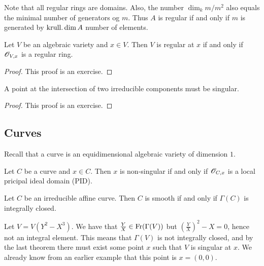 Note that all regular rings are domains.  Also, the number $\dim_k m/m^2$ also equals the minimal number of generators og $m$. Thus $A$ is regular if and only if $m$ is generated by $\operatorname{krull.dim} A$ number of elements. 

\begin{proposition}
Let $V$ be an algebraic variety and $x\in V$. Then $V$ is regular at $x$ if and only if $\mathscr{O}_{V,x}$ is a regular ring.
\end{proposition}
\begin{proof}
This proof is an exercise.
\end{proof}

\begin{proposition}
A point at the intersection of two irreducible components must be singular.
\end{proposition}
\begin{proof}
This proof is an exercise.
\end{proof}


\subsection{Curves}

Recall that a curve is an equidimensional algebraic variety of dimension $1$. 

\begin{proposition}
Let $C$ be a curve and $x\in C$. Then $x$ is non-singular if and only if $\mathscr{O}_{C,x}$ is a local pricipal ideal domain (PID). 
\end{proposition}

\begin{theorem}
Let $C$ be an irreducible affine curve. Then $C$ is smooth if and only if $\Gamma(C)$ is integrally closed. 
\end{theorem}

\begin{example}
Let $V = V(Y^2-X^3)$. We have that $\frac{Y}{X}\in \operatorname{Fr}(\Gamma(V))$ but $(\frac{Y}{X})^2 -X = 0$, hence not an integral element. This means that $\Gamma(V)$ is not integrally closed, and by the last theorem there must exist some point $x$ such that $V$ is singular at $x$. We already know from an earlier example that this point is $x=(0,0)$.  
\end{example}
